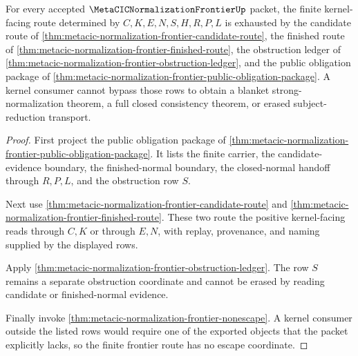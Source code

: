 \begin{theorem}
\label{thm:metacic-normalization-frontier-kernel-nonescape}
For every accepted $\MetaCICNormalizationFrontierUp$ packet, the finite kernel-facing route determined by $C,K,E,N,S,H,R,P,L$ is exhausted by the candidate route of \autoref{thm:metacic-normalization-frontier-candidate-route}, the finished route of \autoref{thm:metacic-normalization-frontier-finished-route}, the obstruction ledger of \autoref{thm:metacic-normalization-frontier-obstruction-ledger}, and the public obligation package of \autoref{thm:metacic-normalization-frontier-public-obligation-package}. A kernel consumer cannot bypass those rows to obtain a blanket strong-normalization theorem, a full closed consistency theorem, or erased subject-reduction transport.
\end{theorem}
\begin{proof}
First project the public obligation package of \autoref{thm:metacic-normalization-frontier-public-obligation-package}. It lists the finite carrier, the candidate-evidence boundary, the finished-normal boundary, the closed-normal handoff through $R,P,L$, and the obstruction row $S$.

Next use \autoref{thm:metacic-normalization-frontier-candidate-route} and \autoref{thm:metacic-normalization-frontier-finished-route}. These two route the positive kernel-facing reads through $C,K$ or through $E,N$, with replay, provenance, and naming supplied by the displayed rows.

Apply \autoref{thm:metacic-normalization-frontier-obstruction-ledger}. The row $S$ remains a separate obstruction coordinate and cannot be erased by reading candidate or finished-normal evidence.

Finally invoke \autoref{thm:metacic-normalization-frontier-nonescape}. A kernel consumer outside the listed rows would require one of the exported objects that the packet explicitly lacks, so the finite frontier route has no escape coordinate.
\end{proof}

